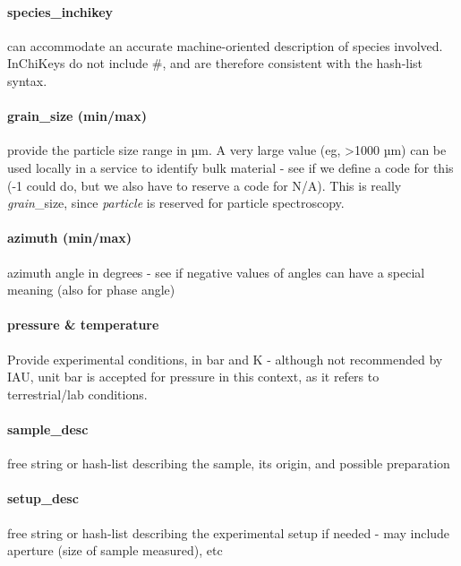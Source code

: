 \documentclass[11pt,a4paper]{ivoa}
\begin{document}
\paragraph{\textbf{species\_inchikey} }

can accommodate an accurate machine-oriented description of species involved. InChiKeys do not include \#, and are therefore consistent with the hash-list syntax.

\paragraph{grain\_size (min/max)}

provide the particle size range in µm. A very large value (eg, >1000 µm) can be used locally in a service to identify bulk material - see if we define a code for this (-1 could do, but we also have to reserve a code for N/A). This is really \emph{grain}\_size, since \emph{particle} is reserved for particle spectroscopy.\\

\paragraph{azimuth (min/max)}

azimuth angle in degrees - see if negative values of angles can have a special meaning (also for phase angle)

\paragraph{pressure \& temperature}

Provide experimental conditions, in bar and K - although not recommended by IAU, unit bar is accepted for pressure in this context, as it refers to terrestrial/lab conditions.

\paragraph{sample\_desc}

free string or hash-list describing the sample, its origin, and possible preparation

\paragraph{setup\_desc}

free string or hash-list describing the experimental setup if needed - may include aperture (size of sample measured), etc
\end{document}

